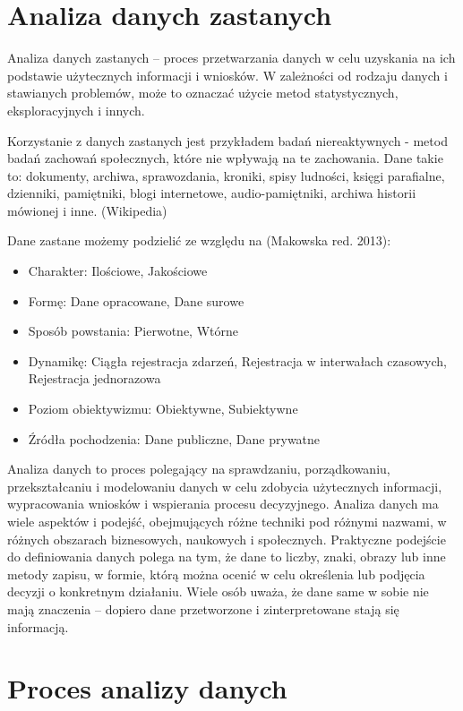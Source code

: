 \documentclass[
  polish,
  letterpaper,
  DIV=11,
  numbers=noendperiod]{scrreprt}
\providecommand{\tightlist}{%
  \setlength{\itemsep}{0pt}\setlength{\parskip}{0pt}}
\begin{document}
\section{Analiza danych zastanych}\label{analiza-danych-zastanych}

Analiza danych zastanych -- proces przetwarzania danych w celu uzyskania
na ich podstawie użytecznych informacji i wniosków. W zależności od
rodzaju danych i stawianych problemów, może to oznaczać użycie metod
statystycznych, eksploracyjnych i innych.

Korzystanie z danych zastanych jest przykładem badań niereaktywnych -
metod badań zachowań społecznych, które nie wpływają na te zachowania.
Dane takie to: dokumenty, archiwa, sprawozdania, kroniki, spisy
ludności, księgi parafialne, dzienniki, pamiętniki, blogi internetowe,
audio-pamiętniki, archiwa historii mówionej i inne. (Wikipedia)

Dane zastane możemy podzielić ze względu na (Makowska red. 2013):

\begin{itemize}
\tightlist
\item
  Charakter: Ilościowe, Jakościowe
\item
  Formę: Dane opracowane, Dane surowe
\item
  Sposób powstania: Pierwotne, Wtórne
\item
  Dynamikę: Ciągła rejestracja zdarzeń, Rejestracja w interwałach
  czasowych, Rejestracja jednorazowa
\item
  Poziom obiektywizmu: Obiektywne, Subiektywne
\item
  Źródła pochodzenia: Dane publiczne, Dane prywatne
\end{itemize}

Analiza danych to proces polegający na sprawdzaniu, porządkowaniu,
przekształcaniu i modelowaniu danych w celu zdobycia użytecznych
informacji, wypracowania wniosków i wspierania procesu decyzyjnego.
Analiza danych ma wiele aspektów i podejść, obejmujących różne techniki
pod różnymi nazwami, w różnych obszarach biznesowych, naukowych i
społecznych. Praktyczne podejście do definiowania danych polega na tym,
że dane to liczby, znaki, obrazy lub inne metody zapisu, w formie, którą
można ocenić w celu określenia lub podjęcia decyzji o konkretnym
działaniu. Wiele osób uważa, że dane same w sobie nie mają znaczenia --
dopiero dane przetworzone i zinterpretowane stają się informacją.

\section{Proces analizy danych}\label{proces-analizy-danych}
\end{document}
